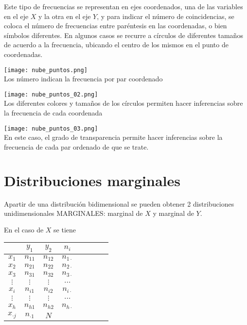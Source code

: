 \documentclass[11 pts, letterpaper, twosided]{article}
\begin{document}
Este tipo de frecuencias se representan en ejes coordenados, una de
las variables en el eje $X$ y la otra en el eje $Y$, y para indicar el
número de coincidencias, se coloca el número de frecuencias entre
paréntesis en las coordenadas, o bien símbolos diferentes. En algunos
casos se recurre a círculos de diferentes tamaños de acuerdo a la
frecuencia, ubicando el centro de los mismos en el punto de
coordenadas.

\begin{center}
    \texttt{[image: nube\_puntos.png]}\\
    Los número indican la frecuencia por par coordenado
\end{center}

\begin{center}
    \texttt{[image: nube\_puntos\_02.png]}\\
Los diferentes colores y tamaños de los círculos permiten
    hacer inferencias sobre la frecuencia de cada coordenada
\end{center}

\begin{center}
    \texttt{[image: nube\_puntos\_03.png]}\\
    En este caso, el grado de transparencia permite hacer inferencias
    sobre la frecuencia de cada par ordenado de que se trate.
\end{center}

\section{Distribuciones marginales}

Apartir de una distribución bidimensional se pueden obtener 2
distribuciones unidimensionales MARGINALES: marginal de $X$ y marginal
de $Y$. 

En el caso de $X$ se tiene

\begin{center}
    \begin{tabular}[c]{|c||c|c|c|c|c|c||c|}
      \hline
      \qquad &  $y_1$ & $y_2$          & $n_i$\\
      \hline
      \hline
      $x_1$  &  $n_{11}$ & $n_{12}$    & $n_{1\cdot}$\\
      \hline
      $x_2$  &  $n_{21}$ & $n_{22}$    & $n_{2\cdot}$\\
      \hline
      $x_3$  &  $n_{31}$ & $n_{32}$    & $n_{3\cdot}$\\
      \hline
      $\vdots$  &  $\vdots$ & $\vdots$ & $\dots$\\
      \hline
      $x_i$  &  $n_{i1}$ & $n_{i2}$    & $n_{i\cdot}$\\
      \hline
      $\vdots$  &  $\vdots$ & $\vdots$ & $\dots$\\
      \hline
      $x_h$  &  $n_{h1}$ & $n_{h2}$    & $n_{h\cdot}$\\
      \hline
      \hline
      $x_{\cdot j}$  &  $n_{\cdot 1}$  & $N$\\
      \hline
    \end{tabular}
\end{center}
\end{document}
